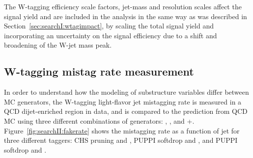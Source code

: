 The W-tagging efficiency scale factors, jet-mass and resolution scales affect the signal yield and are included in the analysis in the same way as was described in Section~\ref{sec:searchI:wtagimpact}, by scaling the total signal yield and incorporating an uncertainty on the signal efficiency due to a shift and broadening of the W-jet mass peak.

\subsection{W-tagging mistag rate measurement} 
\label{sec:searchII:wmistag}
In order to understand how the modeling of substructure variables differ between MC generators, the W-tagging light-flavor jet mistagging rate is measured in a QCD dijet-enriched region in data, and is compared to the prediction from QCD MC using three different combinations of generators: \HERWIG{++}, , and \MADGRAPH{}+.
Figure~\ref{fig:searchII:fakerate} shows the mistagging rate as a function of jet \PT for three different taggers: CHS pruning and \nsubj, PUPPI softdrop and \nsubj, and PUPPI softdrop and \ddt.
